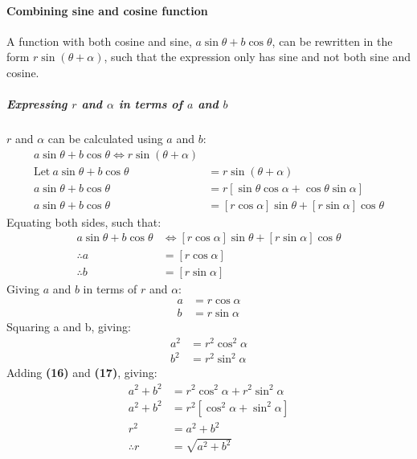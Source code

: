 \documentclass{article}
\begin{document}
        \paragraph{Combining sine and cosine function} A function with both cosine and sine, $a\sin{\theta} + b\cos{\theta}$, can be rewritten in the form $r\sin{(\theta + \alpha)}$, such that the expression only has sine and not both sine and cosine.
        \subparagraph{Expressing $r$ and $\alpha$ in terms of $a$ and $b$} $r$ and $\alpha$ can be calculated using $a$ and $b$:
        \begin{align*}
            a\sin{\theta} + b\cos{\theta} \Leftrightarrow r\sin{(\theta + \alpha)} \\
            \mathrm{Let \ } a\sin{\theta} + b\cos{\theta} &= r\sin{(\theta + \alpha)} \\
            a\sin{\theta} + b\cos{\theta} &= r[\sin\theta\cos\alpha + \cos\theta\sin\alpha] \\
            a\sin{\theta} + b\cos{\theta} &= [r\cos\alpha]\sin{\theta} + [r\sin\alpha]\cos{\theta}
        \end{align*}
        Equating both sides, such that:
        \begin{align*}
            a\sin{\theta} + b\cos{\theta} &\Leftrightarrow [r\cos\alpha]\sin{\theta} + [r\sin\alpha]\cos{\theta} \\
            \therefore a &= [r\cos\alpha] \\
            \therefore b &= [r\sin\alpha]
        \end{align*}
        Giving $a$ and $b$ in terms of $r$ and $\alpha$:
        \begin{align}
            a &= r\cos\alpha \\
            b &= r\sin\alpha
        \end{align}
        Squaring a and b, giving:
        \begin{align}
            a^2 &= r^2\cos^2{\alpha} \\
            b^2 &= r^2\sin^2{\alpha}
        \end{align}
        Adding \textbf{(16)} and \textbf{(17)}, giving:
        \begin{align*}
            a^2 + b^2 &= r^2\cos^2{\alpha} + r^2\sin^2{\alpha} \\
            a^2 + b^2 &= r^2[\cos^2{\alpha} + \sin^2{\alpha}] \\
            r^2 &= a^2 + b^2 \\
            \therefore r &= \sqrt{a^2 + b^2}
        \end{align*}
\end{document}
